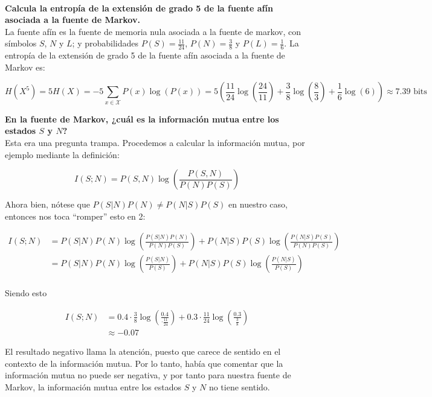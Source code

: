 \documentclass{article}
\begin{document}
~\\
\textbf{Calcula la entropía de la extensión de grado 5 de la fuente afín asociada a la fuente de Markov.}\\

La fuente afín es la fuente de memoria nula asociada a la fuente de markov, con símbolos $S$, $N$ y $L$; y probabilidades $P(S)=\frac{11}{24}$, $P(N)=\frac{3}{8}$ y $P(L)=\frac{1}{6}$. La entropía de la extensión de grado 5 de la fuente afín asociada a la fuente de Markov es:

$$
H(X^5) = 5H(X) = -5\sum_{x\in\mathcal{X}}P(x)\log\left(P(x)\right) = 5\left(\frac{11}{24}\log\left(\frac{24}{11}\right)+\frac{3}{8}\log\left(\frac{8}{3}\right)+\frac{1}{6}\log\left(6\right)\right)\approx 7.39\text{ bits}
$$

\pagebreak
\textbf{En la fuente de Markov, ¿cuál es la información mutua entre los estados $S$ y $N$?}\\

Esta era una pregunta trampa. Procedemos a calcular la información mutua, por ejemplo mediante la definición:

$$
I(S;N) = P(S,N)\log\left(\frac{P(S,N)}{P(N)P(S)}\right)
$$

Ahora bien, nótese que $P(S|N)P(N)\neq P(N|S)P(S)$ en nuestro caso, entonces nos toca ``romper'' esto en 2:

\begin{align*}
I(S;N) &= P(S|N)P(N)\log\left(\frac{P(S|N)P(N)}{P(N)P(S)}\right) + P(N|S)P(S)\log\left(\frac{P(N|S)P(S)}{P(N)P(S)}\right)\\
&= P(S|N)P(N)\log\left(\frac{P(S|N)}{P(S)}\right) + P(N|S)P(S)\log\left(\frac{P(N|S)}{P(S)}\right)\\
\end{align*}

Siendo esto

\begin{align*}
I(S;N) &= 0.4\cdot\frac{3}{8}\log\left(\frac{0.4}{\cdot\frac{11}{24}}\right) + 0.3\cdot\frac{11}{24}\log\left(\frac{0.3}{\frac{3}{8}}\right)\\
&\approx -0.07
\end{align*}

El resultado negativo llama la atención, puesto que carece de sentido en el contexto de la información mutua. Por lo tanto, había que comentar que la información mutua no puede ser negativa, y por tanto para nuestra fuente de Markov, la información mutua entre los estados $S$ y $N$ no tiene sentido.
\end{document}
